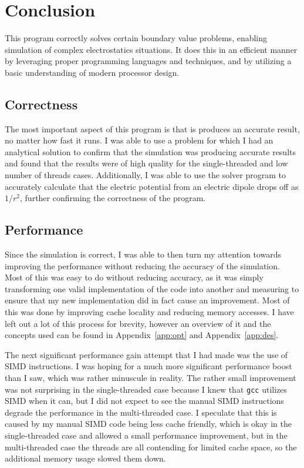 \section{Conclusion}

This program correctly solves certain boundary value problems, enabling simulation
of complex electrostatics situations. It does this in an efficient manner by leveraging
proper programming languages and techniques, and by utilizing a basic understanding of modern processor
design.

\subsection{Correctness}

The most important aspect of this program is that is produces an accurate result, no
matter how fast it runs. I was able to use a problem for which I had an analytical
solution to confirm that the simulation was producing accurate results and found that
the results were of high quality for the single-threaded and low number of threads
cases. Additionally, I was able to use the solver program to accurately calculate
that the electric potential from an electric dipole drops off as $1/r^2$, further
confirming the correctness of the program.


\subsection{Performance}

Since the simulation is correct, I was able to then turn my attention towards improving
the performance without reducing the accuracy of the simulation. Most of this was easy to
do without reducing accuracy, as it was simply transforming one valid implementation of
the code into another and measuring to ensure that my new implementation did in fact
cause an improvement. Most of this was done by improving cache locality and reducing
memory accesses. I have left out a lot of this process for brevity, however an overview
of it and the concepts used can be found in Appendix~\ref{app:opt} and Appendix~\ref{app:des}.

The next significant performance gain attempt that I had made was the use of SIMD instructions.
I was hoping for a much more significant performance boost than I saw, which was rather
minuscule in reality. The rather small improvement was not surprising in the single-threaded
case because I knew that \texttt{gcc} utilizes SIMD when it can, but I did not expect to see
the manual SIMD instructions degrade the performance in the multi-threaded case. I speculate
that this is caused by my manual SIMD code being less cache friendly, which is okay in the
single-threaded case and allowed a small performance improvement, but in the multi-threaded case
the threads are all contending for limited cache space, so the additional memory usage slowed
them down.

